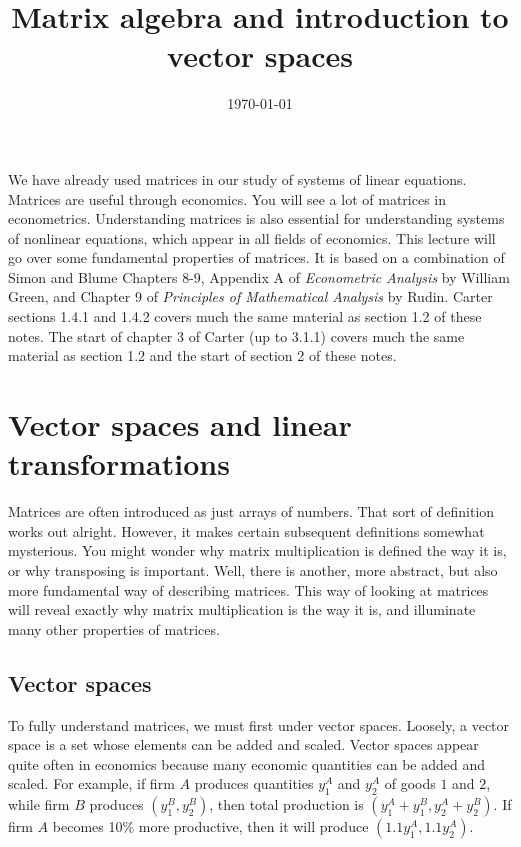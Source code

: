 \documentclass[12pt,reqno]{amsart}
\title{Matrix algebra and introduction to vector spaces}
\date{\today}
\theoremstyle{definition}
\begin{document}
\maketitle

We have already used matrices in our study of systems of linear
equations. Matrices are useful through economics. You will see a lot
of matrices in econometrics. Understanding matrices is also essential
for understanding systems of nonlinear equations, which appear in all
fields of economics. This lecture will go over some fundamental
properties of matrices. It is based on a combination of Simon and
Blume Chapters 8-9, Appendix A of \textit{Econometric Analysis} by
William Green, and Chapter 9 of \textit{Principles of Mathematical
  Analysis} by Rudin. Carter sections 1.4.1 and 1.4.2 covers much the
same material as section 1.2 of these notes. The start of chapter 3 of
Carter (up to 3.1.1) covers much the same material as section 1.2 and
the start of section 2 of these notes. 


\section{Vector spaces and linear transformations}

Matrices are often introduced as just arrays of numbers.  That sort of
definition works out alright. However, it makes certain subsequent
definitions somewhat mysterious. You might wonder why matrix
multiplication is defined the way it is, or why transposing is
important.  Well, there is another, more abstract, but also more
fundamental way of describing matrices. This way of looking at
matrices will reveal exactly why matrix multiplication is the way it
is, and illuminate many other properties of matrices. 

\subsection{Vector spaces}

To fully understand matrices, we must first under vector
spaces. Loosely, a vector space is a set whose elements can be added
and scaled. Vector spaces appear quite often in economics because many
economic quantities can be added and scaled. For example, if firm $A$
produces quantities $y_1^A$ and $y_2^A$ of goods  $1$ and $2$, while
firm $B$ produces $(y_1^B,y_2^B)$, then total production is
$(y_1^A+y_1^B, y_2^A+y_2^B)$. If firm $A$ becomes 10\% more
productive, then it will produce $(1.1 y_1^A, 1.1 y_2^A)$. 
\end{document}
